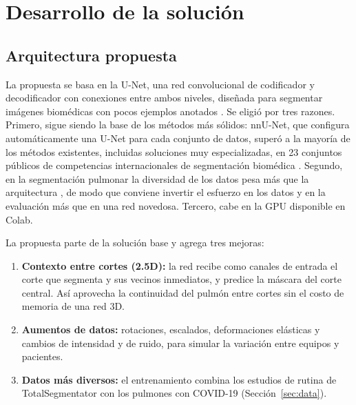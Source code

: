 %

\section{Desarrollo de la solución}\label{sec:development}

\subsection{Arquitectura propuesta}\label{sec:architecture}
La propuesta se basa en la U-Net, una red convolucional de codificador y
decodificador con conexiones entre ambos niveles, diseñada para segmentar
imágenes biomédicas con pocos ejemplos anotados \parencite{ronneberger2015}.
Se eligió por tres razones. Primero, sigue siendo la base de los métodos más
sólidos: nnU-Net, que configura automáticamente una U-Net para cada conjunto de
datos, superó a la mayoría de los métodos existentes, incluidas soluciones muy
especializadas, en 23 conjuntos públicos de competencias internacionales de
segmentación biomédica \parencite{isensee2021}. Segundo, en la segmentación pulmonar la
diversidad de los datos pesa más que la arquitectura \parencite{hofmanninger2020},
de modo que conviene invertir el esfuerzo en los datos y en la evaluación más
que en una red novedosa. Tercero, cabe en la GPU disponible en Colab.

La propuesta parte de la solución base y agrega tres mejoras:

\begin{enumerate}
    \item \textbf{Contexto entre cortes (2.5D):} la red recibe como canales de
          entrada el corte que segmenta y sus vecinos inmediatos, y predice la
          máscara del corte central. Así aprovecha la continuidad del pulmón
          entre cortes sin el costo de memoria de una red 3D.
    \item \textbf{Aumentos de datos:} rotaciones, escalados, deformaciones
          elásticas y cambios de intensidad y de ruido, para simular la
          variación entre equipos y pacientes.
    \item \textbf{Datos más diversos:} el entrenamiento combina los estudios de
          rutina de TotalSegmentator con los pulmones con COVID-19
          (Sección~\ref{sec:data}).
\end{enumerate}

